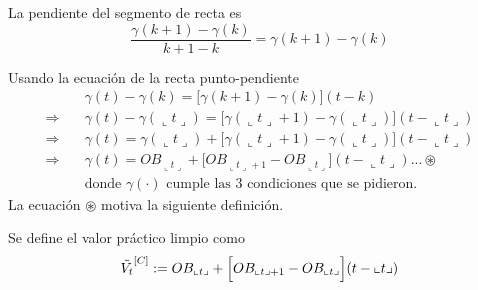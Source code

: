 \begin{center}

\end{center}
La pendiente del segmento de recta es 
$$\frac{\gamma(k+1)-\gamma(k)}{k+1-k} = \gamma(k+1) - \gamma(k)$$

Usando la ecuación de la recta punto-pendiente
\begin{align*}
    &\gamma(t) - \gamma(k) = \big[\gamma(k+1)-\gamma(k)\big](t-k)\\
    \Rightarrow\quad &\gamma(t) -\gamma(\llcorner t\lrcorner) = \Big[\gamma(\llcorner t\lrcorner+1) -\gamma(\llcorner t\lrcorner)\Big](t-\llcorner t\lrcorner)\\
    \Rightarrow\quad &\gamma(t) = \gamma(\llcorner t\lrcorner) + \Big[\gamma(\llcorner t\lrcorner+1) -\gamma(\llcorner t\lrcorner)\Big](t-\llcorner t\lrcorner)\\
    \Rightarrow\quad &\gamma(t) = OB_{\llcorner t\lrcorner} + \Big[OB_{\llcorner t\lrcorner+1} - OB_{\llcorner t\lrcorner}\Big](t-\llcorner t\lrcorner)...\circledast\\
    &\text{donde }\gamma(\cdot) \text{ cumple las 3 condiciones que se pidieron.}
\end{align*}
La ecuación $\circledast$ motiva la siguiente definición.

\begin{definition}
Se define el valor práctico limpio como
$$\Tilde{V_t}^{[C]} := OB_{\llcorner t\lrcorner} + \Big[OB_{\llcorner t\lrcorner+1}-OB_{\llcorner t\lrcorner}\Big](t-\llcorner t\lrcorner)$$
\end{definition}

